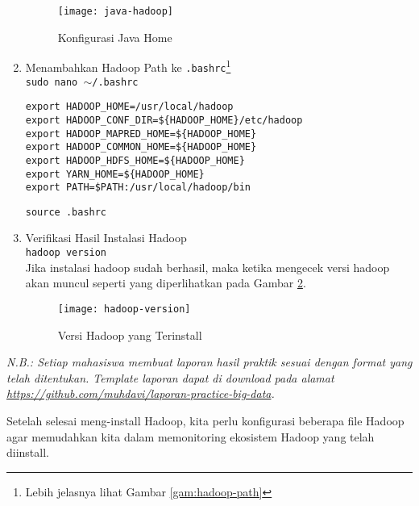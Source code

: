 \documentclass[a4paper]{tufte-handout}
\begin{document}
\begin{enumerate}
\begin{figure}[!ht]
\centering
\texttt{[image: java-hadoop]}
\caption{Konfigurasi Java Home}
\label{gam:java-hadoop}
\end{figure}

\item Menambahkan Hadoop Path ke {\tt .bashrc}\footnote{Lebih jelasnya lihat Gambar \ref{gam:hadoop-path}} \\
{\tt sudo nano $\sim$/.bashrc} \\
\begin{lstlisting}
export HADOOP_HOME=/usr/local/hadoop
export HADOOP_CONF_DIR=${HADOOP_HOME}/etc/hadoop
export HADOOP_MAPRED_HOME=${HADOOP_HOME}
export HADOOP_COMMON_HOME=${HADOOP_HOME}
export HADOOP_HDFS_HOME=${HADOOP_HOME}
export YARN_HOME=${HADOOP_HOME}
export PATH=$PATH:/usr/local/hadoop/bin
\end{lstlisting}

{\tt source .bashrc}

\item Verifikasi Hasil Instalasi Hadoop \\
{\tt hadoop version} \\
Jika instalasi hadoop sudah berhasil, maka ketika mengecek versi hadoop akan muncul seperti yang diperlihatkan pada Gambar \ref{gam:hadoop-version}.
\begin{figure}[!ht]
\texttt{[image: hadoop-version]}
\caption{Versi Hadoop yang Terinstall}
\label{gam:hadoop-version}
\end{figure}
\end{enumerate}
 
\hrulefill

\clearpage
{}
\textit{N.B.: Setiap mahasiswa membuat laporan hasil praktik sesuai dengan format yang telah ditentukan. Template laporan dapat di download pada alamat \url{https://github.com/muhdavi/laporan-practice-big-data}.}


Setelah selesai meng-install Hadoop, kita perlu konfigurasi beberapa file Hadoop agar memudahkan kita dalam memonitoring ekosistem Hadoop yang telah diinstall.
\end{document}
